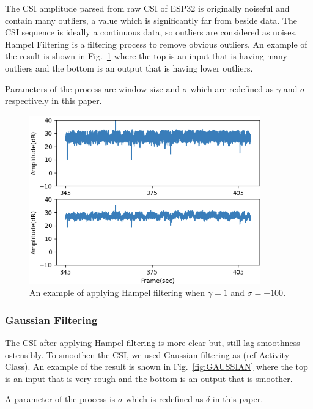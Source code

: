\documentclass[10pt,letterpaper]{article}
\begin{document}
	The CSI amplitude parsed from raw CSI of ESP32 is originally noiseful and contain many outliers, a value which is significantly far from beside data. The CSI sequence is ideally a continuous data, so outliers are considered as noises.  Hampel Filtering is a filtering process to remove obvious outliers. An example of the result is shown in  Fig.~\ref{fig:HAMPEL} where the top is an input that is having many outliers and the bottom is an output that is having lower outliers.
	
		Parameters of the process are window size and $\sigma$ which are redefined as $\gamma$ and $\sigma$ respectively in this paper.
		
		\begin{figure}[htbp]
		\centerline{\includegraphics[width=100mm,scale=0.9]{FILPD_R2H.png}}
		\caption{An example of applying Hampel filtering when $\gamma=1$ and $\sigma=-100$.}
		\label{fig:HAMPEL}
	\end{figure}

	\subsubsection*{Gaussian Filtering}
	
	 The CSI after applying Hampel filtering is more clear but, still lag smoothness ostensibly. To smoothen the CSI, we used Gaussian filtering as (ref Activity Class).
	An example of the result is shown in  Fig.~\ref{fig:GAUSSIAN} where the top is an input that is very rough and the bottom is an output that is smoother.
	
	A parameter of the process is $\sigma$ which is redefined as $\delta$ in this paper.
	
\end{document}
